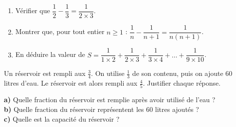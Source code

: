 \documentclass[a4paper,11pt,fleqn]{article}
\begin{document}
\begin{EXO}{}{}
\begin{enumerate}
	\item Vérifier que $\dfrac{1}{2} - \dfrac{1}{3} = \dfrac{1}{2 \times 3}$.
	\item Montrer que, pour tout entier $n \geqslant 1$ : $\dfrac{1}{n} - \dfrac{1}{n + 1} = \dfrac{1}{n(n + 1)}$.
	\item En déduire la valeur de $S = \dfrac{1}{1 \times 2} + \dfrac{1}{2 \times 3} + \dfrac{1}{3 \times 4} + \dots + \dfrac{1}{9 \times 10}$.
\end{enumerate}
\end{EXO}

\begin{EXO}{}{}
Un réservoir est rempli aux $\frac{3}{4}$. On utilise $\frac{1}{3}$ de son contenu, puis on ajoute $60$ litres d'eau. Le réservoir est alors rempli aux $\frac{4}{5}$. Justifier chaque réponse.

\textbf{a)} Quelle fraction du réservoir est remplie après avoir utilisé de l'eau ?\\
\textbf{b)} Quelle fraction du réservoir représentent les $60$ litres ajoutés ?\\
\textbf{c)} Quelle est la capacité du réservoir ?
\end{EXO}


\ifdefined\ELEVE\else
\clearpage
\end{document}
